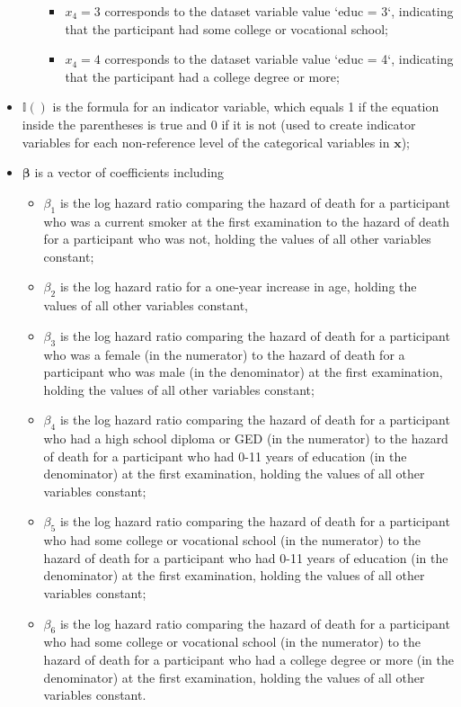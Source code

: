 \documentclass{article}\usepackage[]{graphicx}\usepackage[]{color}
\begin{document}
\begin{itemize}
\begin{itemize}
\begin{itemize}
          \item $x_4 = 3$ corresponds to the dataset variable value `educ = 3`, indicating that the participant had some college or vocational school;
          \item $x_4 = 4$ corresponds to the dataset variable value `educ = 4`, indicating that the participant had a college degree or more;
      \end{itemize}
    \end{itemize}
  \item $\mathbb{I}()$ is the formula for an indicator variable, which equals 1 if the equation inside the parentheses is true and 0 if it is not (used to create indicator variables for each non-reference level of the categorical variables in $\mathbf{x}$);  
  \item $\boldsymbol{\beta}$ is a vector of coefficients including
    \begin{itemize}
      \item $\beta_1$ is the log hazard ratio comparing the hazard of death for a participant who was a current smoker at the first examination to the hazard of death for a participant who was not, holding the values of all other variables constant;
      \item $\beta_2$ is the log hazard ratio for a one-year increase in age, holding the values of all other variables constant,
      \item $\beta_3$ is the log hazard ratio comparing the hazard of death for a participant who was a female (in the numerator) to the hazard of death for a participant who was male (in the denominator) at the first examination, holding the values of all other variables constant;
      \item $\beta_4$ is the log hazard ratio comparing the hazard of death for a participant who had a high school diploma or GED (in the numerator) to the hazard of death for a participant who had 0-11 years of education (in the denominator) at the first examination, holding the values of all other variables constant;
      \item $\beta_5$ is the log hazard ratio comparing the hazard of death for a participant who had some college or vocational school (in the numerator) to the hazard of death for a participant who had 0-11 years of education (in the denominator) at the first examination, holding the values of all other variables constant;
      \item $\beta_6$ is the log hazard ratio comparing the hazard of death for a participant who had some college or vocational school (in the numerator) to the hazard of death for a participant who had a college degree or more (in the denominator) at the first examination, holding the values of all other variables constant.
    \end{itemize}
  \end{itemize}
      
\end{document}
